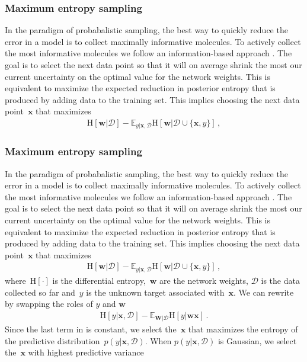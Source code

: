 \subsubsection{Maximum entropy sampling}

In the paradigm of probabalistic sampling, the best way to quickly reduce the error in a model is to collect maximally informative molecules. To actively collect the most informative molecules we follow an information-based approach \cite{MacKay_1992}. The goal
is to select the next data point so that it will on average shrink the most our current uncertainty on the optimal value for the network weights. This is equivalent to maximize the expected reduction in posterior entropy that is produced by adding data to the training set. This implies choosing the next data point~$\mathbf{x}$ that maximizes
\begin{align}
\text{H}[\mathbf{w}|\mathcal{D}] - 
\mathbb{E}_{y|\mathbf{x},\mathcal{D}}\text{H}[\mathbf{w}|\mathcal{D}\cup\{\mathbf{x},y\}]\,,\label{eq:acq_func}
\end{align}
\subsubsection{Maximum entropy sampling}

In the paradigm of probabalistic sampling, the best way to quickly reduce the error in a model is to collect maximally informative molecules. To actively collect the most informative molecules we follow an information-based approach \cite{MacKay_1992}. The goal
is to select the next data point so that it will on average shrink the most our current uncertainty on the optimal value for the network weights. This is equivalent to maximize the expected reduction in posterior entropy that is produced by adding data to the training set. This implies choosing the next data point~$\mathbf{x}$ that maximizes
\begin{align}
\text{H}[\mathbf{w}|\mathcal{D}] - 
\mathbb{E}_{y|\mathbf{x},\mathcal{D}}\text{H}[\mathbf{w}|\mathcal{D}\cup\{\mathbf{x},y\}]\,,\label{eq:acq_func}
\end{align}
where~$\text{H}[\cdot]$ is the differential entropy,~$\mathbf{w}$ are the network weights, $\mathcal{D}$ is the data collected so far and~$y$ is the unknown target associated with~$\mathbf{x}$. We can rewrite  by swapping the roles of $y$ and $\mathbf{w}$ %
\begin{align}
\text{H}[y | \mathbf{x},\mathcal{D}] - 
\mathbb{E}_{\mathbf{W} | \mathcal{D}}\text{H}[y | \mathbf{w}\mathbf{x}]\,.\label{eq:new_acquisition_function}
\end{align}
Since the last term in is constant, we select the~$\mathbf{x}$ that maximizes the entropy of the predictive distribution~$p(y| \mathbf{x},\mathcal{D})$. When $p(y| \mathbf{x},\mathcal{D})$ is Gaussian, we select the~$\mathbf{x}$ with highest predictive variance